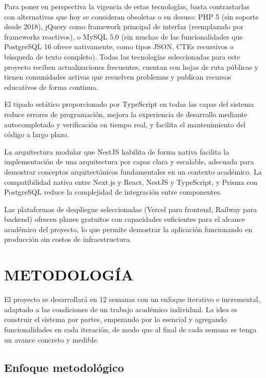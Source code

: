 \documentclass[spanish]{ieee_upb}
\begin{document}
Para poner en perspectiva la vigencia de estas tecnologías, basta contrastarlas con alternativas que hoy se consideran obsoletas o en desuso: PHP 5 (sin soporte desde 2018), jQuery como framework principal de interfaz (reemplazado por frameworks reactivos), o MySQL 5.0 (sin muchas de las funcionalidades que PostgreSQL 16 ofrece nativamente, como tipos JSON, CTEs recursivos o búsqueda de texto completo). Todas las tecnologías seleccionadas para este proyecto reciben actualizaciones frecuentes, cuentan con hojas de ruta públicas y tienen comunidades activas que resuelven problemas y publican recursos educativos de forma continua.

El tipado estático proporcionado por TypeScript en todas las capas del sistema reduce errores de programación, mejora la experiencia de desarrollo mediante autocompletado y verificación en tiempo real, y facilita el mantenimiento del código a largo plazo.

La arquitectura modular que NestJS habilita de forma nativa facilita la implementación de una arquitectura por capas clara y escalable, adecuada para demostrar conceptos arquitectónicos fundamentales en un contexto académico. La compatibilidad nativa entre Next.js y React, NestJS y TypeScript, y Prisma con PostgreSQL reduce la complejidad de integración entre componentes.

Las plataformas de despliegue seleccionadas (Vercel para frontend, Railway para backend) ofrecen planes gratuitos con capacidades suficientes para el alcance académico del proyecto, lo que permite demostrar la aplicación funcionando en producción sin costos de infraestructura.



\newpage
\section{METODOLOGÍA}

El proyecto se desarrollará en 12 semanas con un enfoque iterativo e incremental, adaptado a las condiciones de un trabajo académico individual. La idea es construir el sistema por partes, empezando por lo esencial y agregando funcionalidades en cada iteración, de modo que al final de cada semana se tenga un avance concreto y medible.

\subsection{Enfoque metodológico}
\end{document}
